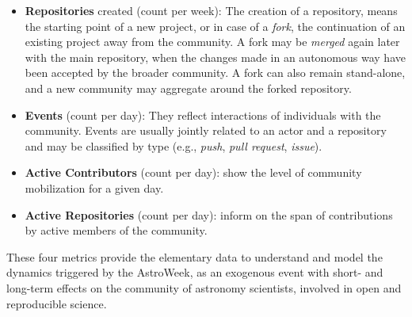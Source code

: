 \begin{itemize}
  \item {\bf Repositories} created (count per week): The creation of a repository, means the starting point of a new project, or in case of a {\it fork}, the continuation of an existing project away from the community. A fork may be {\it merged} again later with the main repository, when the changes made in an autonomous way have been accepted by the broader community. A fork can also remain stand-alone, and a new community may aggregate around the forked repository.
  \item {\bf Events} (count per day): They reflect interactions of individuals with the community. Events are usually jointly related to an actor and a repository and may be classified by type (e.g., {\it push}, {\it pull request}, {\it issue}).
  \item {\bf Active Contributors} (count per day): show the level of community mobilization for a given day.
  \item {\bf Active Repositories} (count per day): inform on the span of contributions by active members of the community.
\end{itemize}

These four metrics provide the elementary data to understand and model the dynamics triggered by the AstroWeek, as an exogenous event with short- and long-term effects on the community of astronomy scientists, involved in open and reproducible science. 

